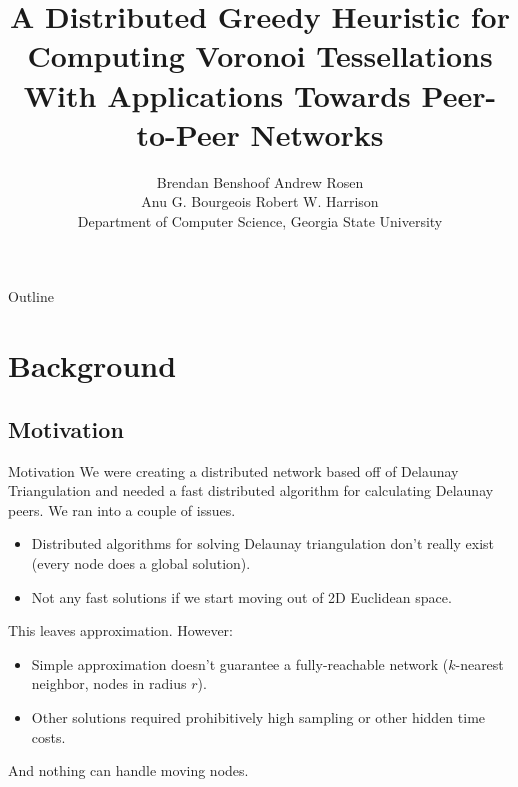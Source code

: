 \documentclass[8pt]{beamer}
\title{A Distributed Greedy Heuristic for Computing Voronoi Tessellations With Applications Towards Peer-to-Peer Networks}
\author{Brendan Benshoof \qquad Andrew Rosen \qquad \\Anu G. Bourgeois \qquad Robert W. Harrison \\Department of Computer Science, Georgia State University}
\begin{document}
	\maketitle
	
	
	
\begin{frame}{Outline}
	\tableofcontents
\end{frame}
	
	
\section{Background}
\subsection{Motivation}
	
	\begin{frame}{Motivation}
		We were creating a distributed network based off of Delaunay Triangulation and needed a fast distributed algorithm for calculating Delaunay peers.
		We ran into a couple of issues.
		\begin{itemize}
			\item Distributed algorithms for solving Delaunay triangulation don't really exist (every node does a global solution).
			\item Not any fast solutions if we start moving out of 2D Euclidean space.
		\end{itemize}
		This leaves approximation.  However:
		\begin{itemize}
			\item Simple approximation doesn't guarantee a fully-reachable network ($k$-nearest neighbor, nodes in radius $r$).
			\item Other solutions \cite{voronet} required prohibitively high sampling or other hidden time costs.
		\end{itemize}
		And nothing can handle moving nodes.
	\end{frame}		
	
	
	
	

		
		
		
		
		
	
\end{document}
